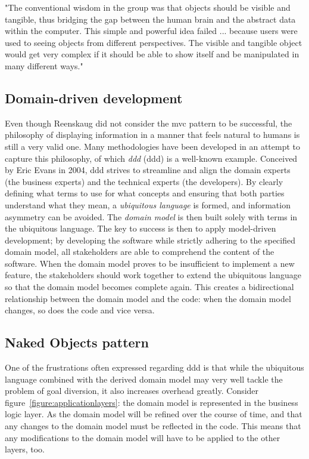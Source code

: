 \begin{displayquote}
"The conventional wisdom in the group was that objects should be visible and tangible, thus bridging the gap between the human brain and the abstract data within the computer. This simple and powerful idea failed ... because users were used to seeing objects from different perspectives. The visible and tangible object would get very complex if it should be able to show itself and be manipulated in many different ways."
\end{displayquote}

\subsection{Domain-driven development}
\label{subsection:domaindrivendevelopment}
Even though Reenskaug did not consider the \acrshort{mvc} pattern to be successful, the philosophy of displaying information in a manner that feels natural to humans is still a very valid one. Many methodologies have been developed in an attempt to capture this philosophy, of which \textit{\acrlong{ddd}} (\acrshort{ddd}) is a well-known example. Conceived by Eric Evans in 2004, \acrshort{ddd} strives to streamline and align the domain experts (the business experts) and the technical experts (the developers). By clearly defining what terms to use for what concepts and ensuring that both parties understand what they mean, a \textit{ubiquitous language} is formed, and information asymmetry can be avoided\cite{evans2004domain}. The \textit{domain model} is then built solely with terms in the ubiquitous language. The key to success is then to apply model-driven development; by developing the software while strictly adhering to the specified domain model, all stakeholders are able to comprehend the content of the software. When the domain model proves to be insufficient to implement a new feature, the stakeholders should work together to extend the ubiquitous language so that the domain model becomes complete again. This creates a bidirectional relationship between the domain model and the code: when the domain model changes, so does the code and vice versa.

\subsection{Naked Objects pattern}
\label{subsection:nakedobjectspattern}
One of the frustrations often expressed regarding \acrshort{ddd} is that while the ubiquitous language combined with the derived domain model may very well tackle the problem of goal diversion, it also increases overhead greatly. Consider figure~\ref{figure:applicationlayers}: the domain model is represented in the business logic layer. As the domain model will be refined over the course of time, and that any changes to the domain model must be reflected in the code. This means that any modifications to the domain model will have to be applied to the other layers, too.

